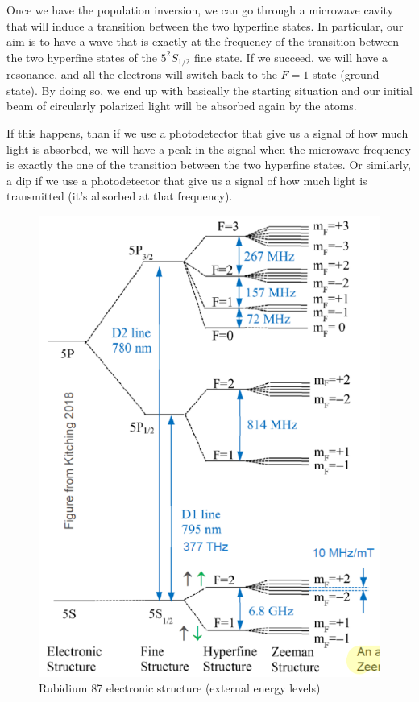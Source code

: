 Once we have the population inversion, we can go through a microwave cavity that will induce a transition between the two hyperfine states.
In particular, our aim is to have a wave that is exactly at the frequency of the transition between the two hyperfine states of the $5^2S_{1/2}$ fine state.
If we succeed, we will have a resonance, and all the electrons will switch back to the $F=1$ state (ground state).
By doing so, we end up with basically the starting situation and our initial beam of circularly polarized light will be absorbed again by the atoms.

If this happens, than if we use a photodetector that give us a signal of how much light is absorbed, we will have a peak in the signal when the microwave frequency is exactly the one of the transition between the two hyperfine states.
Or similarly, a dip if we use a photodetector that give us a signal of how much light is transmitted (it's absorbed at that frequency).

\begin{figure}[H]
    \centering
    \includegraphics[width=\linewidth]{img/02.1-rubidium-electronic-structure.png}
    \caption{Rubidium 87 electronic structure (external energy levels)}
    \label{fig:rubidium-electronic-structure}
\end{figure}

